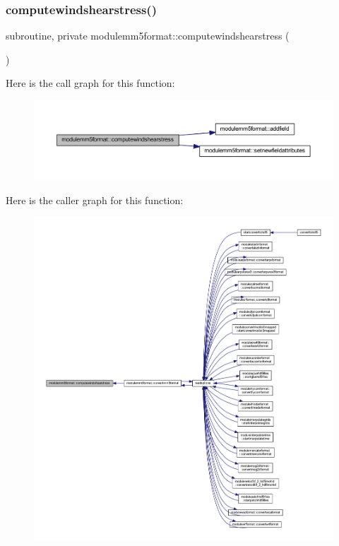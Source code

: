 \subsubsection{\texorpdfstring{computewindshearstress()}{computewindshearstress()}}
{\footnotesize\ttfamily subroutine, private modulemm5format\+::computewindshearstress (\begin{DoxyParamCaption}{ }\end{DoxyParamCaption})\hspace{0.3cm}{\ttfamily [private]}}

Here is the call graph for this function\+:\nopagebreak
\begin{figure}[H]
\begin{center}
\leavevmode
\includegraphics[width=350pt]{namespacemodulemm5format_af869ebd4b03375bc5013329b9bce52d7_cgraph}
\end{center}
\end{figure}
Here is the caller graph for this function\+:\nopagebreak
\begin{figure}[H]
\begin{center}
\leavevmode
\includegraphics[width=350pt]{namespacemodulemm5format_af869ebd4b03375bc5013329b9bce52d7_icgraph}
\end{center}
\end{figure}
\mbox{\label{namespacemodulemm5format_aaf7b2df73bb7e6d30db2af2b3493559a}} 
